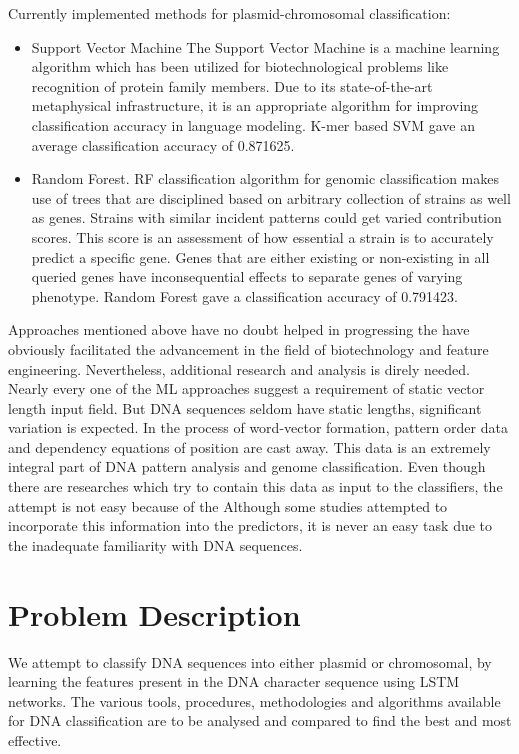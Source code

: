 \documentclass[conference]{IEEEtran}
\begin{document}
Currently implemented methods for plasmid-chromosomal classification:
\begin{itemize}
    \item Support Vector Machine\newline
    The Support Vector Machine is a machine learning algorithm which has been utilized for biotechnological problems like recognition of protein family members. Due to its state-of-the-art metaphysical infrastructure, it is an appropriate algorithm for improving classification accuracy in language modeling. K-mer based SVM gave an average classification accuracy of 0.871625.\cite{svm}

    \item Random Forest.\newline
    RF classification algorithm for genomic classification makes use of trees that are disciplined based on arbitrary collection of strains as well as genes. Strains with similar incident patterns could get varied contribution scores. This score is an assessment of how essential a strain is to accurately predict a specific gene. Genes that are either existing or non-existing in all queried genes have inconsequential effects to separate genes of varying phenotype. Random Forest gave a classification accuracy of 0.791423.\cite{randomforest}\newline
\end{itemize} 

Approaches mentioned above have no doubt helped in progressing the have obviously facilitated the advancement in the field of biotechnology and feature engineering. Nevertheless, additional research and analysis is direly needed. Nearly every one of the ML approaches suggest a requirement of static vector length input field. But DNA sequences seldom have static lengths, significant variation is expected. In the process of word-vector formation, pattern order data and dependency equations of position are cast away. This data is an extremely integral part of DNA pattern analysis and genome classification. Even though there are researches which try to contain this data as input to the classifiers, the attempt is not easy because of the Although some studies attempted to incorporate this information into the predictors, it is never an easy task due to the inadequate familiarity with DNA sequences.

\section{Problem Description}
We attempt to classify DNA sequences into either plasmid or chromosomal, by learning the features present in the DNA character sequence using LSTM networks.
The various tools, procedures, methodologies and algorithms available for DNA classification are to be analysed  and compared to find the best and most effective. 
\end{document}
